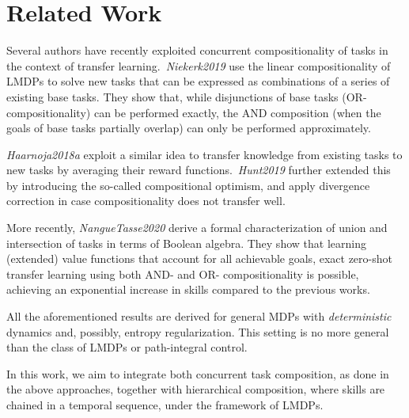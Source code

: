 \section{Related Work}
Several authors have recently exploited concurrent compositionality of tasks in the context of transfer learning.~\textit{Niekerk2019} use the linear compositionality of LMDPs to solve new tasks that can be expressed as combinations of a series of existing base tasks. They show that, while disjunctions of base tasks (OR-compositionality) can be performed exactly, the AND composition (when the goals of base tasks partially overlap) can only be performed approximately.

\textit{Haarnoja2018a} exploit a similar idea to transfer knowledge from existing tasks to new tasks by averaging their reward functions.~\textit{Hunt2019} further extended this by introducing the so-called compositional optimism, and apply divergence correction in case compositionality does not transfer well.

More recently, \textit{NangueTasse2020} derive a formal characterization of union and intersection of tasks in terms of Boolean algebra. They show that learning (extended) value functions that account for all achievable goals, exact zero-shot transfer learning using both AND- and OR- compositionality is possible, achieving an exponential increase in skills compared to the previous works.

All the aforementioned results are derived for general MDPs with \emph{deterministic} dynamics and, possibly, entropy regularization. This setting is no more general than the class of LMDPs or path-integral control.



In this work, we aim to integrate both concurrent task composition, as done in the above approaches, together with hierarchical composition, where skills are chained in a temporal sequence, under the framework of LMDPs.

